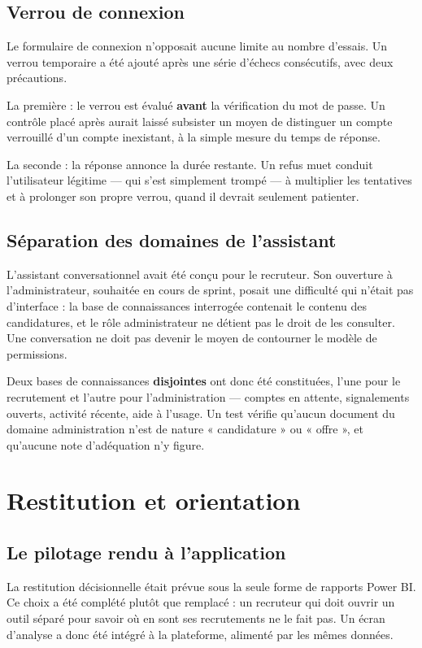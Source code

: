 \documentclass[11pt,a4paper]{article}
\begin{document}
\subsection{Verrou de connexion}
Le formulaire de connexion n'opposait aucune limite au nombre d'essais. Un verrou temporaire a été ajouté après une série d'échecs consécutifs, avec deux précautions.

La première : le verrou est évalué \textbf{avant} la vérification du mot de passe. Un contrôle placé après aurait laissé subsister un moyen de distinguer un compte verrouillé d'un compte inexistant, à la simple mesure du temps de réponse.

La seconde : la réponse annonce la durée restante. Un refus muet conduit l'utilisateur légitime --- qui s'est simplement trompé --- à multiplier les tentatives et à prolonger son propre verrou, quand il devrait seulement patienter.

\subsection{Séparation des domaines de l'assistant}
L'assistant conversationnel avait été conçu pour le recruteur. Son ouverture à l'administrateur, souhaitée en cours de sprint, posait une difficulté qui n'était pas d'interface : la base de connaissances interrogée contenait le contenu des candidatures, et le rôle administrateur ne détient pas le droit de les consulter. Une conversation ne doit pas devenir le moyen de contourner le modèle de permissions.

Deux bases de connaissances \textbf{disjointes} ont donc été constituées, l'une pour le recrutement et l'autre pour l'administration --- comptes en attente, signalements ouverts, activité récente, aide à l'usage. Un test vérifie qu'aucun document du domaine administration n'est de nature « candidature » ou « offre », et qu'aucune note d'adéquation n'y figure.

\section{Restitution et orientation}\label{sec:restitution}

\subsection{Le pilotage rendu à l'application}
La restitution décisionnelle était prévue sous la seule forme de rapports Power BI. Ce choix a été complété plutôt que remplacé : un recruteur qui doit ouvrir un outil séparé pour savoir où en sont ses recrutements ne le fait pas. Un écran d'analyse a donc été intégré à la plateforme, alimenté par les mêmes données.
\end{document}
